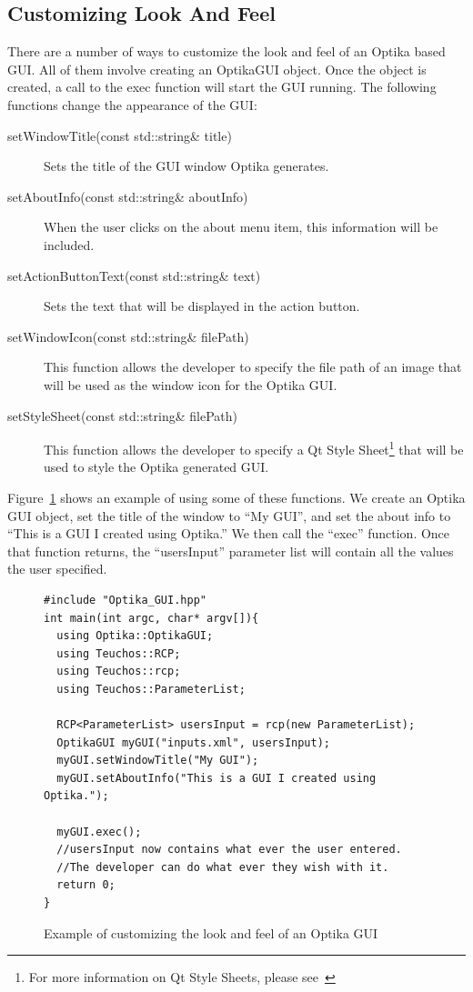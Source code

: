 \subsection{Customizing Look And Feel}
There are a number of ways to customize the look and feel of an Optika based GUI. All of them involve creating an OptikaGUI object. 
Once the object is created, a call to the exec function will start the GUI running. The following functions change the appearance of the 
GUI:
\begin{description}
\item[setWindowTitle(const std::string\& title)] Sets the title of the GUI window Optika generates.
\item[setAboutInfo(const std::string\& aboutInfo)] When the user clicks on the about menu item, this information will be included.
\item[setActionButtonText(const std::string\& text)] Sets the text that will be displayed in the action button.
\item[setWindowIcon(const std::string\& filePath)] This function allows the developer to specify the file path of an image that will be 
used as the window icon for the Optika GUI.
\item[setStyleSheet(const std::string\& filePath)] This function allows the developer to specify a Qt Style Sheet\footnote{For 
more information on Qt Style Sheets, please see~\cite{QtStyle}} that will be used to style the Optika generated GUI.
\end{description}

Figure~\ref{lookGui} shows an example of using some of these functions. We create an Optika GUI object, set the title of the window to 
``My GUI'', and set the about info to ``This is a GUI I created using Optika.'' We then call the ``exec'' function. Once that 
function returns, the ``usersInput'' parameter list will contain all the values the user specified.
\begin{figure}
\centering
{\footnotesize
\begin{Verbatim}
#include "Optika_GUI.hpp"
int main(int argc, char* argv[]){
  using Optika::OptikaGUI;
  using Teuchos::RCP;
  using Teuchos::rcp;
  using Teuchos::ParameterList;

  RCP<ParameterList> usersInput = rcp(new ParameterList);
  OptikaGUI myGUI("inputs.xml", usersInput);
  myGUI.setWindowTitle("My GUI");
  myGUI.setAboutInfo("This is a GUI I created using Optika.");

  myGUI.exec();
  //usersInput now contains what ever the user entered.
  //The developer can do what ever they wish with it.
  return 0;
}
\end{Verbatim}
}
\caption{Example of customizing the look and feel of an Optika GUI}
\label{lookGui}
\end{figure}

